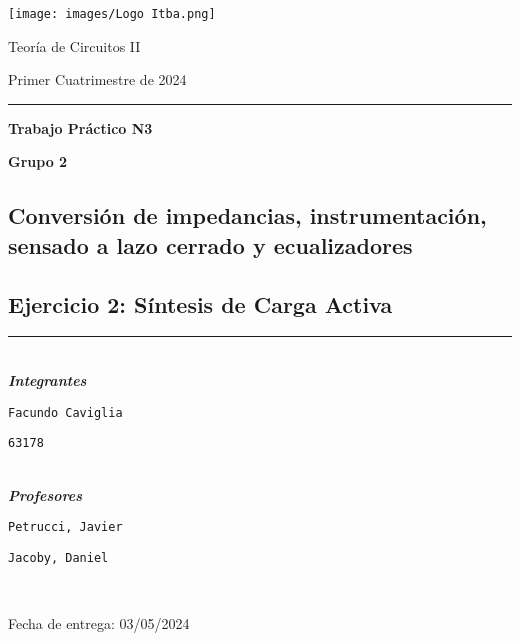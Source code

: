 \documentclass[12pt,oneside,a4paper]{article}
\begin{document}
\begin{titlepage}
	\centering
	\texttt{[image: images/Logo Itba.png]}\par\vspace{0.5cm}
	{\LARGE Teoría de Circuitos II \par} 
	\vspace{0.5cm}
	{\Large \color{gray} Primer Cuatrimestre de 2024\par}
        \rule{150mm}{0.1mm}
	{\LARGE\bfseries Trabajo Pr\'actico N3\par}
        {\Large\bfseries Grupo 2 \par}
        \subsection*{Conversi\'on de impedancias, instrumentaci\'on, sensado a lazo
        cerrado y ecualizadores}
        \vspace{0.2cm}
        \subsection*{Ejercicio 2: S\'intesis de Carga Activa}
        \rule{150mm}{0.1mm}
        \vspace{0.5cm} \\
	{\LARGE\bfseries\itshape Integrantes}\par \vspace{0.1cm}
        \begin{minipage}[b]{0.4\linewidth}
            \texttt{Facundo Caviglia}\par 
        \end{minipage}
        \begin{minipage}[b]{0.2\linewidth}
            \texttt{63178}\par
        \end{minipage} \\
        \vspace{1cm}
	{\LARGE\bfseries\itshape Profesores}\par \vspace{0.1cm}
        \begin{minipage}[b]{0.4\linewidth}
            \texttt{Petrucci, Javier}\par
            \texttt{Jacoby, Daniel}\par
        \end{minipage}\\
        \vspace{1cm}
	\vfill
	{\large Fecha de entrega: 03/05/2024\par} %
\end{titlepage}
\end{document}
